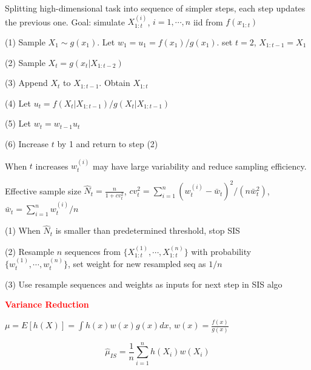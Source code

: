 \documentclass{article}
\renewcommand{\section}[1]{\textcolor{red}{\textbf{#1}}}
\renewcommand{\subsection}[1]{\text{\hl{[#1]}}}
\begin{document}
\subsection{Sequential MC}

Splitting high-dimensional task into sequence of simpler steps, each step updates the previous one.
Goal: simulate $X_{1:t}^{(i)}$, $i=1, \cdots, n$ iid from $f(x_{1:t})$

(1) Sample $X_1\sim g(x_1)$. Let $w_1 = u_1 = f(x_1)/g(x_1)$. set $t=2$, $X_{1:t-1}=X_1$

(2) Sample $X_t=g(x_t|X_{1:t-2})$

(3) Append $X_t$ to $X_{1:t-1}$. Obtain $X_{1:t}$

(4) Let $u_t = f(X_t|X_{1:t-1})/g(X_t|X_{1:t-1})$

(5) Let $w_t = w_{t-1}u_t$

(6) Increase $t$ by 1 and return to step (2)

\subsection{SISR}

When $t$ increases $w_t^{(i)}$ may have large variability and reduce sampling efficiency.

Effective sample size $\hat N_t = \frac{n}{1 + cv_t^2}$, $cv_t^2 = \sum_{i=1}^{n} (w_t^{(i)} - \bar w_t )^2 / (n \bar w_t^2)$,
$\bar w_t = \sum_{i=1}^n w_t^{(i)} / n$

(1) When $\hat N_t$ is smaller than predetermined threshold, stop SIS

(2) Resample $n$ sequences from $\{ X_{1:t}^{(1)}, \cdots, X_{1:t}^{(n)} \}$
with probability $\{w_t^{(1)}, \cdots, w_t^{(n)}\}$, set weight for new resampled seq as $1/n$

(3) Use resample sequences and weights as inputs for next step in SIS algo


\section{Variance Reduction}


\subsection{Importance Sampling}

$\mu = E[h(X)] = \int h(x) w(x) g(x) dx$, $w(x) = \frac{f(x)}{g(x)}$

$$
    \hat\mu_{IS} = \frac{1}{n} \sum_{i=1}^n h(X_i) w(X_i)
$$
\end{document}

